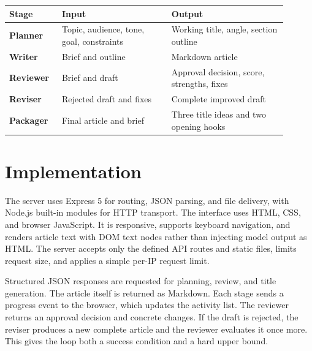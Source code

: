 \documentclass[10pt,letterpaper]{article}
\begin{document}
\begin{center}
\end{center}

\begin{center}
\begin{tabular}{>{\bfseries}p{0.16\linewidth}p{0.36\linewidth}p{0.38\linewidth}}
\toprule
Stage & Input & Output \\
\midrule
Planner & Topic, audience, tone, goal, constraints & Working title, angle, section outline \\
Writer & Brief and outline & Markdown article \\
Reviewer & Brief and draft & Approval decision, score, strengths, fixes \\
Reviser & Rejected draft and fixes & Complete improved draft \\
Packager & Final article and brief & Three title ideas and two opening hooks \\
\bottomrule
\end{tabular}
\end{center}

\newpage
\section{Implementation}
The server uses Express 5 for routing, JSON parsing, and file delivery, with Node.js built-in modules for HTTP transport. The interface uses HTML, CSS, and browser JavaScript. It is responsive, supports keyboard navigation, and renders article text with DOM text nodes rather than injecting model output as HTML. The server accepts only the defined API routes and static files, limits request size, and applies a simple per-IP request limit.

Structured JSON responses are requested for planning, review, and title generation. The article itself is returned as Markdown. Each stage sends a progress event to the browser, which updates the activity list. The reviewer returns an approval decision and concrete changes. If the draft is rejected, the reviser produces a new complete article and the reviewer evaluates it once more. This gives the loop both a success condition and a hard upper bound.
\end{document}
